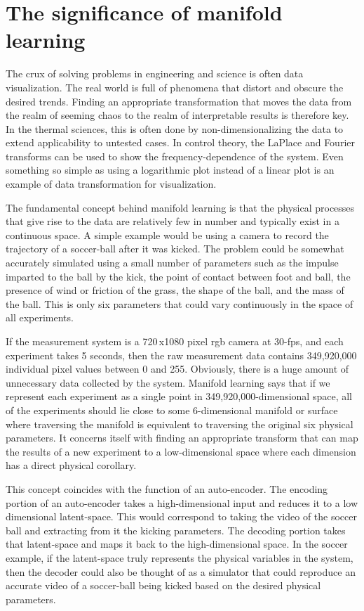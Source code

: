 \documentclass{article}
\begin{document}
\section{The significance of manifold learning}
The crux of solving problems in engineering and science is often data visualization. The real world is full of phenomena that distort and obscure the desired trends. Finding an appropriate transformation that moves the data from the realm of seeming chaos to the realm of interpretable results is therefore key. In the thermal sciences, this is often done by non-dimensionalizing the data to extend applicability to untested cases. In control theory, the LaPlace and Fourier transforms can be used to show the frequency-dependence of the system. Even something so simple as using a logarithmic plot instead of a linear plot is an example of data transformation for visualization.

The fundamental concept behind manifold learning is that the physical processes that give rise to the data are relatively few in number and typically exist in a continuous space. A simple example would be using a camera to record the trajectory of a soccer-ball after it was kicked. The problem could be somewhat accurately simulated using a small number of parameters such as the impulse imparted to the ball by the kick, the point of contact between foot and ball, the presence of wind or friction of the grass, the shape of the ball, and the mass of the ball. This is only six parameters that could vary continuously in the space of all experiments. 

If the measurement system is a 720\,x1080 pixel rgb camera at 30-fps, and each experiment takes 5 seconds, then the raw measurement data contains 349,920,000 individual pixel values between 0 and 255. Obviously, there is a huge amount of unnecessary data collected by the system. Manifold learning says that if we represent each experiment as a single point in 349,920,000-dimensional space, all of the experiments should lie close to some 6-dimensional manifold or surface where traversing the manifold is equivalent to traversing the original six physical parameters. It concerns itself with finding an appropriate transform that can map the results of a new experiment to a low-dimensional space where each dimension has a direct physical corollary. 

This concept coincides with the function of an auto-encoder. The encoding portion of an auto-encoder takes a high-dimensional input and reduces it to a low dimensional latent-space. This would correspond to taking the video of the soccer ball and extracting from it the kicking parameters. The decoding portion takes that latent-space and maps it back to the high-dimensional space. In the soccer example, if the latent-space truly represents the physical variables in the system, then the decoder could also be thought of as a simulator that could reproduce an accurate video of a soccer-ball being kicked based on the desired physical parameters. 
\end{document}
